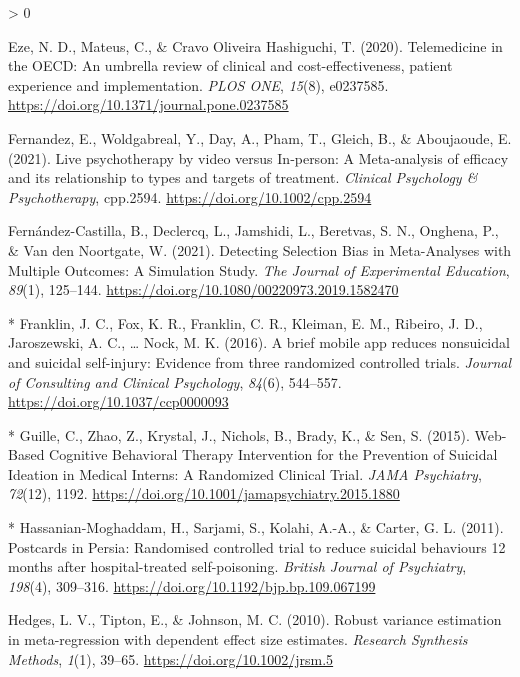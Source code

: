\documentclass[
  english,
  man]{apa6}
\newlength{\cslhangindent}
\newenvironment{CSLReferences}[2] %
 {%
  \setlength{\parindent}{0pt}
  \ifodd #1 \everypar{\setlength{\hangindent}{\cslhangindent}}\ignorespaces\fi
  \ifnum #2 > 0
  \setlength{\parskip}{#2\baselineskip}
  \fi
 }%
 {}
\begin{document}
\begin{CSLReferences}{1}{0}
\leavevmode\hypertarget{ref-eze2020}{}%
Eze, N. D., Mateus, C., \& Cravo Oliveira Hashiguchi, T. (2020). Telemedicine in the {OECD}: An umbrella review of clinical and cost-effectiveness, patient experience and implementation. \emph{PLOS ONE}, \emph{15}(8), e0237585. \url{https://doi.org/10.1371/journal.pone.0237585}

\leavevmode\hypertarget{ref-fernandez2021}{}%
Fernandez, E., Woldgabreal, Y., Day, A., Pham, T., Gleich, B., \& Aboujaoude, E. (2021). Live psychotherapy by video versus {In}‐person: A {Meta}‐analysis of efficacy and its relationship to types and targets of treatment. \emph{Clinical Psychology \& Psychotherapy}, cpp.2594. \url{https://doi.org/10.1002/cpp.2594}

\leavevmode\hypertarget{ref-fernandez-castilla2021}{}%
Fernández-Castilla, B., Declercq, L., Jamshidi, L., Beretvas, S. N., Onghena, P., \& Van den Noortgate, W. (2021). Detecting {Selection Bias} in {Meta}-{Analyses} with {Multiple Outcomes}: A {Simulation Study}. \emph{The Journal of Experimental Education}, \emph{89}(1), 125--144. \url{https://doi.org/10.1080/00220973.2019.1582470}

\leavevmode\hypertarget{ref-franklin2016}{}%
* Franklin, J. C., Fox, K. R., Franklin, C. R., Kleiman, E. M., Ribeiro, J. D., Jaroszewski, A. C., \ldots{} Nock, M. K. (2016). A brief mobile app reduces nonsuicidal and suicidal self-injury: Evidence from three randomized controlled trials. \emph{Journal of Consulting and Clinical Psychology}, \emph{84}(6), 544--557. \url{https://doi.org/10.1037/ccp0000093}

\leavevmode\hypertarget{ref-guille2015}{}%
* Guille, C., Zhao, Z., Krystal, J., Nichols, B., Brady, K., \& Sen, S. (2015). Web-{Based Cognitive Behavioral Therapy Intervention} for the {Prevention} of {Suicidal Ideation} in {Medical Interns}: A {Randomized Clinical Trial}. \emph{JAMA Psychiatry}, \emph{72}(12), 1192. \url{https://doi.org/10.1001/jamapsychiatry.2015.1880}

\leavevmode\hypertarget{ref-hassanian-moghaddam2011}{}%
* Hassanian-Moghaddam, H., Sarjami, S., Kolahi, A.-A., \& Carter, G. L. (2011). Postcards in {Persia}: Randomised controlled trial to reduce suicidal behaviours 12 months after hospital-treated self-poisoning. \emph{British Journal of Psychiatry}, \emph{198}(4), 309--316. \url{https://doi.org/10.1192/bjp.bp.109.067199}

\leavevmode\hypertarget{ref-hedges2010}{}%
Hedges, L. V., Tipton, E., \& Johnson, M. C. (2010). Robust variance estimation in meta-regression with dependent effect size estimates. \emph{Research Synthesis Methods}, \emph{1}(1), 39--65. \url{https://doi.org/10.1002/jrsm.5}


\end{CSLReferences}
\end{document}
